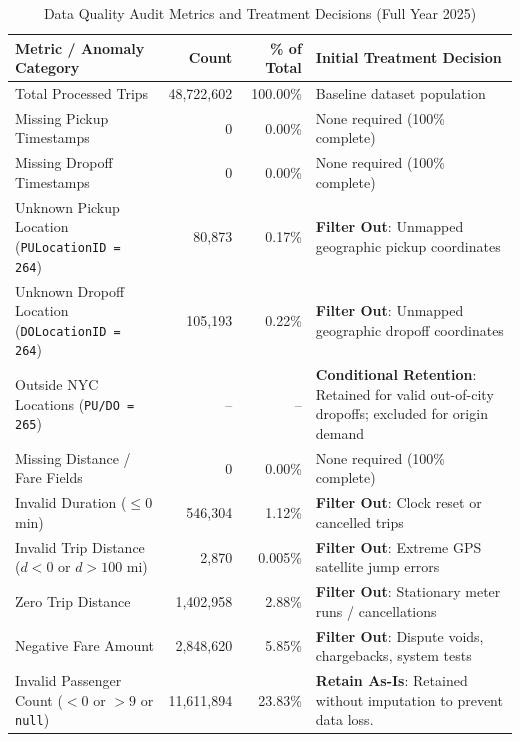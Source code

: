 \documentclass[11pt,a4paper]{article}
\begin{document}
\begin{table}[htbp]
\centering
\caption{Data Quality Audit Metrics and Treatment Decisions (Full Year 2025)}
\label{tab:quality_audit}
\small
\begin{tabularx}{\textwidth}{lrrX}
\toprule
\textbf{Metric / Anomaly Category} & \textbf{Count} & \textbf{\% of Total} & \textbf{Initial Treatment Decision} \\
\midrule
Total Processed Trips & 48,722,602 & 100.00\% & Baseline dataset population \\
Missing Pickup Timestamps & 0 & 0.00\% & None required (100\% complete) \\
Missing Dropoff Timestamps & 0 & 0.00\% & None required (100\% complete) \\
Unknown Pickup Location (\texttt{PULocationID = 264}) & 80,873 & 0.17\% & \textbf{Filter Out}: Unmapped geographic pickup coordinates \\
Unknown Dropoff Location (\texttt{DOLocationID = 264}) & 105,193 & 0.22\% & \textbf{Filter Out}: Unmapped geographic dropoff coordinates \\
Outside NYC Locations (\texttt{PU/DO = 265}) & -- & -- & \textbf{Conditional Retention}: Retained for valid out-of-city dropoffs; excluded for origin demand \\
Missing Distance / Fare Fields & 0 & 0.00\% & None required (100\% complete) \\
\midrule
Invalid Duration ($\le 0$ min) & 546,304 & 1.12\% & \textbf{Filter Out}: Clock reset or cancelled trips \\
Invalid Trip Distance ($d < 0$ or $d > 100$ mi) & 2,870 & 0.005\% & \textbf{Filter Out}: Extreme GPS satellite jump errors \\ 
Zero Trip Distance & 1,402,958 & 2.88\% & \textbf{Filter Out}: Stationary meter runs / cancellations \\
Negative Fare Amount & 2,848,620 & 5.85\% & \textbf{Filter Out}: Dispute voids, chargebacks, system tests \\
Invalid Passenger Count ($<0$ or $>9$ or \texttt{null}) & 11,611,894 & 23.83\% & \textbf{Retain As-Is}: Retained without imputation to prevent data loss. \\
\bottomrule
\end{tabularx}
\end{table}
\end{document}

